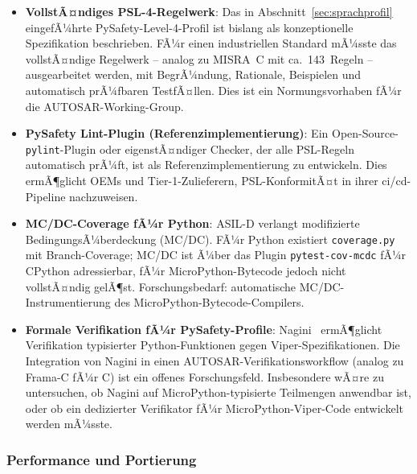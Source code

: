 ﻿\documentclass[12pt,a4paper,twoside]{article}
\begin{document}
\begin{itemize}
  \item \textbf{VollstÃ¤ndiges PSL-4-Regelwerk}:
        Das in Abschnitt~\ref{sec:sprachprofil} eingefÃ¼hrte PySafety-Level-4-Profil
        ist bislang als konzeptionelle Spezifikation beschrieben.
        FÃ¼r einen industriellen Standard mÃ¼sste das vollstÃ¤ndige Regelwerk
        -- analog zu MISRA~C mit ca.\ 143~Regeln -- ausgearbeitet werden,
        mit BegrÃ¼ndung, Rationale, Beispielen und automatisch prÃ¼fbaren
        TestfÃ¤llen. Dies ist ein Normungsvorhaben fÃ¼r die AUTOSAR-Working-Group.

  \item \textbf{PySafety Lint-Plugin (Referenzimplementierung)}:
        Ein Open-Source-\texttt{pylint}-Plugin oder eigenstÃ¤ndiger Checker,
        der alle PSL-Regeln automatisch prÃ¼ft, ist als Referenzimplementierung
        zu entwickeln. Dies ermÃ¶glicht OEMs und Tier-1-Zulieferern, PSL-KonformitÃ¤t
        in ihrer \gls{ci}/\gls{cd}-Pipeline nachzuweisen.

  \item \textbf{MC/DC-Coverage fÃ¼r Python}:
        ASIL-D verlangt modifizierte BedingungsÃ¼berdeckung (MC/DC).
        FÃ¼r Python existiert \texttt{coverage.py} mit Branch-Coverage; MC/DC ist
        Ã¼ber das Plugin \texttt{pytest-cov-mcdc} fÃ¼r CPython adressierbar, fÃ¼r
        MicroPython-Bytecode jedoch nicht vollstÃ¤ndig gelÃ¶st.
        Forschungsbedarf: automatische MC/DC-Instrumentierung des
        MicroPython-Bytecode-Compilers.

  \item \textbf{Formale Verifikation fÃ¼r PySafety-Profile}:
        Nagini~\cite{nagini2018} ermÃ¶glicht Verifikation typisierter Python-Funktionen
        gegen Viper-Spezifikationen.
        Die Integration von Nagini in einen AUTOSAR-Verifikationsworkflow
        (analog zu Frama-C fÃ¼r C) ist ein offenes Forschungsfeld.
        Insbesondere wÃ¤re zu untersuchen, ob Nagini auf MicroPython-typisierte
        Teilmengen anwendbar ist, oder ob ein dedizierter Verifikator fÃ¼r
        MicroPython-Viper-Code entwickelt werden mÃ¼sste.
\end{itemize}

\subsubsection{Performance und Portierung}
\end{document}
